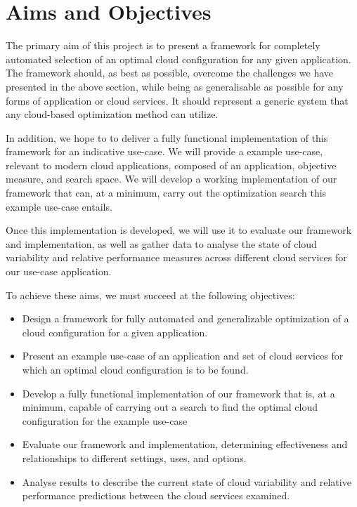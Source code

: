 \documentclass{report}
\begin{document}
\section{Aims and Objectives}
The primary aim of this project is to present a framework for completely automated selection of an optimal cloud configuration for any given application. The framework should, as best as possible, overcome the challenges we have presented in the above section, while being as generalisable as possible for any forms of application or cloud services. It should represent a generic system that any cloud-based optimization method can utilize.

In addition, we hope to to deliver a fully functional implementation of this framework for an indicative use-case. We will provide a example use-case, relevant to modern cloud applications, composed of an application, objective measure, and search space. We will develop a working implementation of our framework that can, at a minimum, carry out the optimization search this example use-case entails.

Once this implementation is developed, we will use it to evaluate our framework and implementation, as well as gather data to analyse the state of cloud variability and relative performance measures across different cloud services for our use-case application.  

To achieve these aims, we must succeed at the following objectives:
\begin{itemize}
\item Design a framework for fully automated and generalizable optimization of a cloud configuration for a given application.
\item Present an example use-case of an application and set of cloud services for which an optimal cloud configuration is to be found.
\item Develop a fully functional implementation of our framework that is, at a minimum, capable of carrying out a search to find the optimal cloud configuration for the example use-case
\item Evaluate our framework and implementation, determining effectiveness and relationships to different settings, uses, and options.
\item Analyse results to describe the current state of cloud variability and relative performance predictions between the cloud services examined.
\end{itemize}
\end{document}
